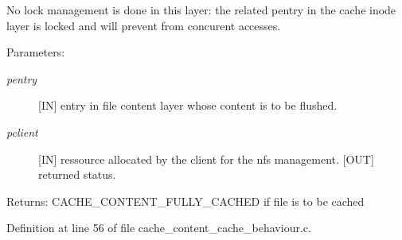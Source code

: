 No lock management is done in this layer: the related pentry in the cache inode layer is locked and will prevent from concurent accesses.

\begin{Desc}
\item[Parameters:]
\begin{description}
\item[{\em pentry}][IN] entry in file content layer whose content is to be flushed. \item[{\em pclient}][IN] ressource allocated by the client for the nfs management.  [OUT] returned status.\end{description}
\end{Desc}
\begin{Desc}
\item[Returns:]CACHE\_\-CONTENT\_\-FULLY\_\-CACHED if file is to be cached \end{Desc}


Definition at line 56 of file cache\_\-content\_\-cache\_\-behaviour.c.
